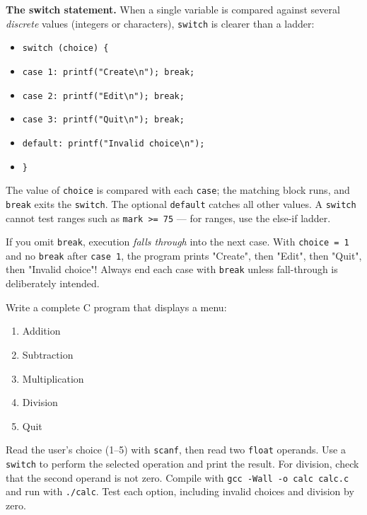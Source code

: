 \documentclass[11pt]{article}
\begin{document}
\textbf{The switch statement.} When a single variable is compared against several \emph{discrete} values (integers or characters), \texttt{switch} is clearer than a ladder:

\begin{itemize}
\item \texttt{switch (choice) \{}
\item \texttt{\quad case 1: printf("Create\textbackslash n"); break;}
\item \texttt{\quad case 2: printf("Edit\textbackslash n"); break;}
\item \texttt{\quad case 3: printf("Quit\textbackslash n"); break;}
\item \texttt{\quad default: printf("Invalid choice\textbackslash n");}
\item \texttt{\}}
\end{itemize}

The value of \texttt{choice} is compared with each \texttt{case}; the matching block runs, and \texttt{break} exits the \texttt{switch}. The optional \texttt{default} catches all other values. A \texttt{switch} cannot test ranges such as \texttt{mark >= 75} — for ranges, use the else-if ladder.

\begin{attention}
If you omit \texttt{break}, execution \emph{falls through} into the next case. With \texttt{choice = 1} and no \texttt{break} after \texttt{case 1}, the program prints "Create", then "Edit", then "Quit", then "Invalid choice"! Always end each case with \texttt{break} unless fall-through is deliberately intended.
\end{attention}

\begin{experience}
Write a complete C program that displays a menu:
\begin{enumerate}
\item Addition
\item Subtraction
\item Multiplication
\item Division
\item Quit
\end{enumerate}
Read the user's choice (1--5) with \texttt{scanf}, then read two \texttt{float} operands. Use a \texttt{switch} to perform the selected operation and print the result. For division, check that the second operand is not zero. Compile with \texttt{gcc -Wall -o calc calc.c} and run with \texttt{./calc}. Test each option, including invalid choices and division by zero.
\end{experience}
\end{document}
